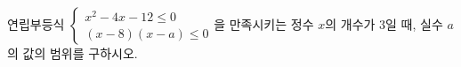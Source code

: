 \hspace*{2mm}\begin{minipage}[t]{\dimexpr\linewidth-2mm\relax}\vspace{0pt}
연립부등식 $\begin{cases} x^2-4x-12\le 0 \\ (x-8)(x-a)\le 0 \end{cases}$을 만족시키는 정수 $x$의 개수가 $3$일 때, 실수 $a$의 값의 범위를 구하시오.\end{minipage}
